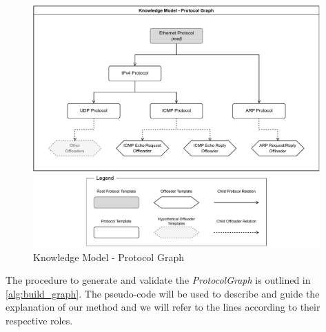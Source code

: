 \begin{figure}[htb]
    \caption{Knowledge Model - Protocol Graph}
    \begin{center}
        \includegraphics[width=0.98\textwidth]{images/icmp_ex_protocol_graph.pdf}  
    \end{center}
    \label{fig:protocol_graph}
\end{figure}

The procedure to generate and validate the \textit{ProtocolGraph} is outlined in \autoref{alg:build_graph}. The pseudo-code will be used to describe and guide the explanation of our method and we will refer to the lines according to their respective roles.

